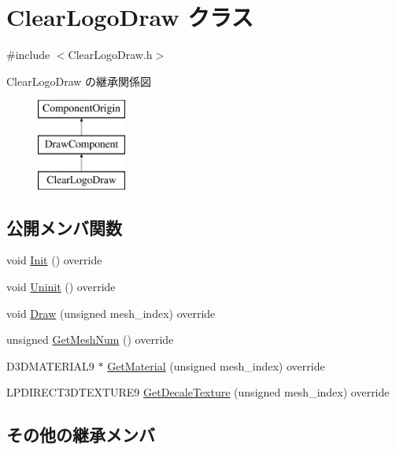 \hypertarget{class_clear_logo_draw}{}\section{Clear\+Logo\+Draw クラス}
\label{class_clear_logo_draw}


{\ttfamily \#include $<$Clear\+Logo\+Draw.\+h$>$}

Clear\+Logo\+Draw の継承関係図\begin{figure}[H]
\begin{center}
\leavevmode
\includegraphics[height=3.000000cm]{class_clear_logo_draw}
\end{center}
\end{figure}
\subsection*{公開メンバ関数}
\begin{DoxyCompactItemize}
\item 
void \mbox{\hyperlink{class_clear_logo_draw_a9af656c0a8ebfb5fa133a0983add6ffd}{Init}} () override
\item 
void \mbox{\hyperlink{class_clear_logo_draw_aa73db5b701e644f8e552ddb254a0a9aa}{Uninit}} () override
\item 
void \mbox{\hyperlink{class_clear_logo_draw_ad3501ec3720bf2f2878de2785432eee7}{Draw}} (unsigned mesh\+\_\+index) override
\item 
unsigned \mbox{\hyperlink{class_clear_logo_draw_aac55b995c8003022b4e308da81c904b3}{Get\+Mesh\+Num}} () override
\item 
D3\+D\+M\+A\+T\+E\+R\+I\+A\+L9 $\ast$ \mbox{\hyperlink{class_clear_logo_draw_a7b91990fdd431ecbc189e8304ca5626d}{Get\+Material}} (unsigned mesh\+\_\+index) override
\item 
L\+P\+D\+I\+R\+E\+C\+T3\+D\+T\+E\+X\+T\+U\+R\+E9 \mbox{\hyperlink{class_clear_logo_draw_ac0355042ed00a3eff2b30da938ba8776}{Get\+Decale\+Texture}} (unsigned mesh\+\_\+index) override
\end{DoxyCompactItemize}
\subsection*{その他の継承メンバ}


